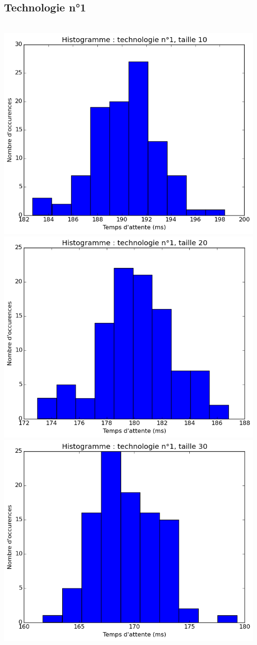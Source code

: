 \documentclass[a4paper,10pt]{article}
\begin{document}
\subsection{Technologie n°1}
\\
\includegraphics[scale=0.4]{img/1-10.png}
\includegraphics[scale=0.4]{img/1-20.png}
\\
\includegraphics[scale=0.4]{img/1-30.png}
\end{document}
